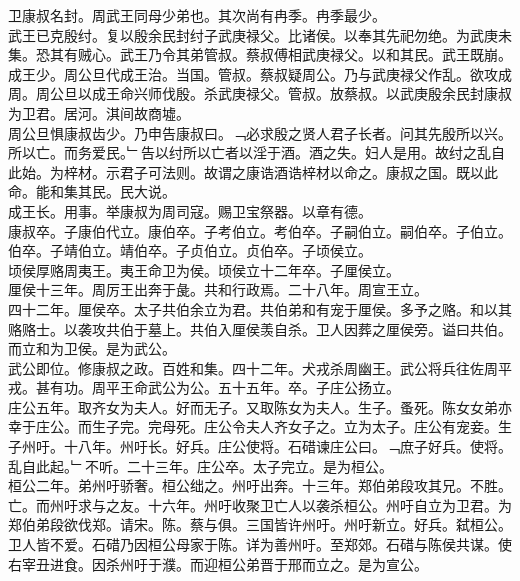 \documentclass{zhvt-classic}
\begin{document}

\hspace*{2em}卫康叔名封。周武王同母少弟也。其次尚有冉季。冉季最少。\\
\hspace*{2em}武王已克殷纣。复以殷余民封纣子武庚禄父。比诸侯。以奉其先祀勿绝。为武庚未集。恐其有贼心。武王乃令其弟管叔。蔡叔傅相武庚禄父。以和其民。武王既崩。成王少。周公旦代成王治。当国。管叔。蔡叔疑周公。乃与武庚禄父作乱。欲攻成周。周公旦以成王命兴师伐殷。杀武庚禄父。管叔。放蔡叔。以武庚殷余民封康叔为卫君。居河。淇间故商墟。\\
\hspace*{2em}周公旦惧康叔齿少。乃申告康叔曰。﹁必求殷之贤人君子长者。问其先殷所以兴。所以亡。而务爱民。﹂告以纣所以亡者以淫于酒。酒之失。妇人是用。故纣之乱自此始。为梓材。示君子可法则。故谓之康诰酒诰梓材以命之。康叔之国。既以此命。能和集其民。民大说。\\
\hspace*{2em}成王长。用事。举康叔为周司寇。赐卫宝祭器。以章有德。\\
\hspace*{2em}康叔卒。子康伯代立。康伯卒。子考伯立。考伯卒。子嗣伯立。嗣伯卒。子伯立。伯卒。子靖伯立。靖伯卒。子贞伯立。贞伯卒。子顷侯立。\\
\hspace*{2em}顷侯厚赂周夷王。夷王命卫为侯。顷侯立十二年卒。子厘侯立。\\
\hspace*{2em}厘侯十三年。周厉王出奔于彘。共和行政焉。二十八年。周宣王立。\\
\hspace*{2em}四十二年。厘侯卒。太子共伯余立为君。共伯弟和有宠于厘侯。多予之赂。和以其赂赂士。以袭攻共伯于墓上。共伯入厘侯羡自杀。卫人因葬之厘侯旁。谥曰共伯。而立和为卫侯。是为武公。\\
\hspace*{2em}武公即位。修康叔之政。百姓和集。四十二年。犬戎杀周幽王。武公将兵往佐周平戎。甚有功。周平王命武公为公。五十五年。卒。子庄公扬立。\\
\hspace*{2em}庄公五年。取齐女为夫人。好而无子。又取陈女为夫人。生子。蚤死。陈女女弟亦幸于庄公。而生子完。完母死。庄公令夫人齐女子之。立为太子。庄公有宠妾。生子州吁。十八年。州吁长。好兵。庄公使将。石碏谏庄公曰。﹁庶子好兵。使将。乱自此起。﹂不听。二十三年。庄公卒。太子完立。是为桓公。\\
\hspace*{2em}桓公二年。弟州吁骄奢。桓公绌之。州吁出奔。十三年。郑伯弟段攻其兄。不胜。亡。而州吁求与之友。十六年。州吁收聚卫亡人以袭杀桓公。州吁自立为卫君。为郑伯弟段欲伐郑。请宋。陈。蔡与俱。三国皆许州吁。州吁新立。好兵。弑桓公。卫人皆不爱。石碏乃因桓公母家于陈。详为善州吁。至郑郊。石碏与陈侯共谋。使右宰丑进食。因杀州吁于濮。而迎桓公弟晋于邢而立之。是为宣公。\\
\end{document}
